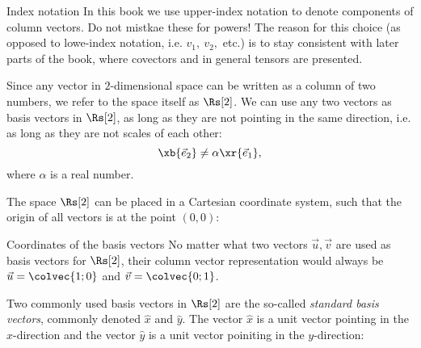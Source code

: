 \begin{note}{Index notation}{}
  In this book we use upper-index notation to denote components of column vectors. Do not mistkae these for powers! The reason for this choice (as opposed to lowe-index notation, i.e. $v_{1},\ v_{2},$ etc.) is to stay consistent with later parts of the book, where covectors and in general tensors are presented.
\end{note}

Since any vector in $2$-dimensional space can be written as a column of two numbers, we refer to the space itself as $\Rs[2]$. We can use any two vectors as basis vectors in $\Rs[2]$, as long as they are not pointing in the same direction, i.e. as long as they are not scales of each other:
\begin{equation}
  \xb{\vec{e}_{2}} \neq \alpha\xr{\vec{e}_{1}},
  \label{eq:basis_vectors_not_scales}
\end{equation}
where $\alpha$ is a real number.

The space $\Rs[2]$ can be placed in a Cartesian coordinate system, such that the origin of all vectors is at the point $(0,0)$:

\begin{center}
\end{center}

\begin{note}{Coordinates of the basis vectors}{}
  No matter what two vectors $\vec{u}, \vec{v}$ are used as basis vectors for $\Rs[2]$, their column vector representation would always be $\vec{u}=\colvec{1;0}$ and $\vec{v}=\colvec{0;1}$.
\end{note}

Two commonly used basis vectors in $\Rs[2]$ are the so-called \emph{standard basis vectors}, commonly denoted $\hat{x}$ and $\hat{y}$. The vector $\hat{x}$ is a unit vector pointing in the $x$-direction and the vector $\hat{y}$ is a unit vector poiniting in the $y$-direction:


